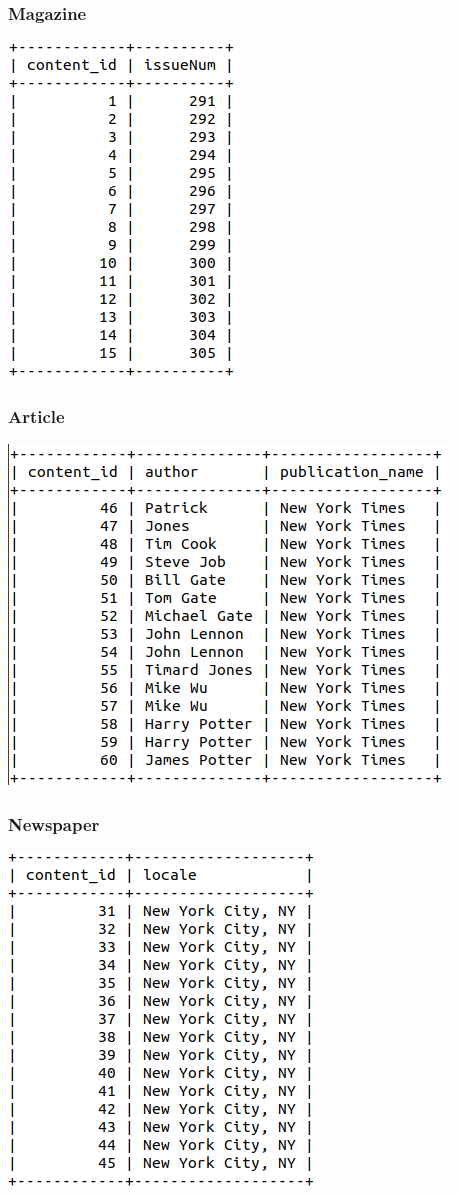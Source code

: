 \documentclass[letter, 12pt, titlepage]{article}
\begin{document}
		\subsubsection{Magazine}
			\includegraphics[scale=.5]{magazine.png}
		\subsubsection{Article}
			\includegraphics[scale=.5]{article.png}
		\subsubsection{Newspaper}
			\includegraphics[scale=.5]{newspaper.png}
\end{document}
